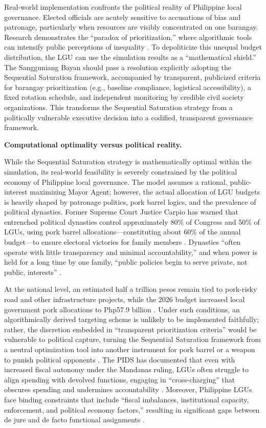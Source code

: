 Real-world implementation confronts the political reality of Philippine local governance. Elected officials are acutely sensitive to accusations of bias and patronage, particularly when resources are visibly concentrated on one barangay. Research demonstrates the “paradox of prioritization,” where algorithmic tools can intensify public perceptions of inequality \citep{Alphonso2024}. To depoliticize this unequal budget distribution, the LGU can use the simulation results as a “mathematical shield.” The Sangguniang Bayan should pass a resolution explicitly adopting the Sequential Saturation framework, accompanied by transparent, publicized criteria for barangay prioritization (e.g., baseline compliance, logistical accessibility), a fixed rotation schedule, and independent monitoring by credible civil society organizations. This transforms the Sequential Saturation strategy from a politically vulnerable executive decision into a codified, transparent governance framework.

\noindent \textbf{Computational optimality versus political reality.}

While the Sequential Saturation strategy is mathematically optimal within the simulation, its real-world feasibility is severely constrained by the political economy of Philippine local governance. The model assumes a rational, public-interest maximizing Mayor Agent; however, the actual allocation of LGU budgets is heavily shaped by patronage politics, pork barrel logics, and the prevalence of political dynasties. Former Supreme Court Justice Carpio has warned that entrenched political dynasties control approximately 80\% of Congress and 50\% of LGUs, using pork barrel allocations—constituting about 60\% of the annual budget—to ensure electoral victories for family members \citep{Carpio2025a}. Dynasties “often operate with little transparency and minimal accountability,” and when power is held for a long time by one family, “public policies begin to serve private, not public, interests” \citep{Tribune2025}. 

At the national level, an estimated half a trillion pesos remain tied to pork-risky road and other infrastructure projects, while the 2026 budget increased local government pork allocations to Php57.9 billion \citep{IBON2026}. Under such conditions, an algorithmically derived targeting scheme is unlikely to be implemented faithfully; rather, the discretion embedded in “transparent prioritization criteria” would be vulnerable to political capture, turning the Sequential Saturation framework from a neutral optimization tool into another instrument for pork barrel or a weapon to punish political opponents \citep{PIDS2024}. The PIDS has documented that even with increased fiscal autonomy under the Mandanas ruling, LGUs often struggle to align spending with devolved functions, engaging in “cross-charging” that obscures spending and undermines accountability \citep{PIDS2024}. Moreover, Philippine LGUs face binding constraints that include “fiscal imbalances, institutional capacity, enforcement, and political economy factors,” resulting in significant gaps between de jure and de facto functional assignments \citep{PIDS2025a}. 

